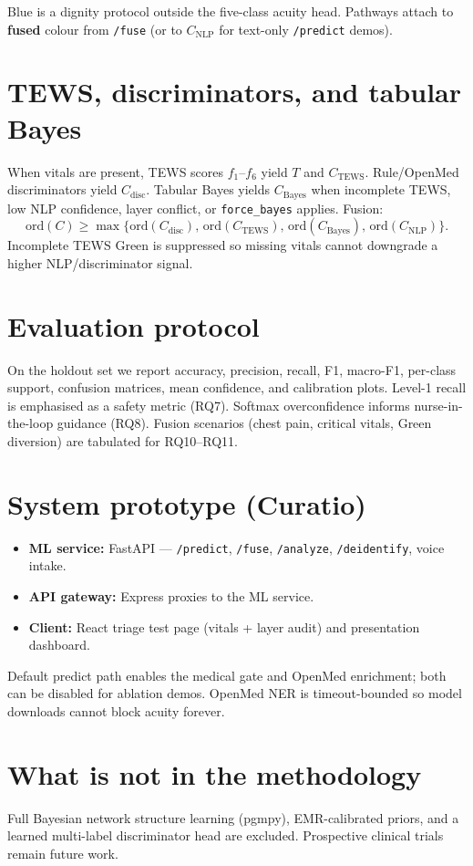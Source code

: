 Blue is a dignity protocol outside the five-class acuity head. Pathways attach to \textbf{fused} colour from \texttt{/fuse} (or to \(C_{\mathrm{NLP}}\) for text-only \texttt{/predict} demos).

\section{TEWS, discriminators, and tabular Bayes}

When vitals are present, TEWS scores \(f_1\)--\(f_6\) yield \(T\) and \(C_{\mathrm{TEWS}}\). Rule/OpenMed discriminators yield \(C_{\mathrm{disc}}\). Tabular Bayes yields \(C_{\mathrm{Bayes}}\) when incomplete TEWS, low NLP confidence, layer conflict, or \texttt{force\_bayes} applies. Fusion:
\[
\mathrm{ord}(C)\ge\max\bigl\{\mathrm{ord}(C_{\mathrm{disc}}),\,\mathrm{ord}(C_{\mathrm{TEWS}}),\,\mathrm{ord}(C_{\mathrm{Bayes}}),\,\mathrm{ord}(C_{\mathrm{NLP}})\bigr\}.
\]
Incomplete TEWS Green is suppressed so missing vitals cannot downgrade a higher NLP/discriminator signal.

\section{Evaluation protocol}

On the holdout set we report accuracy, precision, recall, F1, macro-F1, per-class support, confusion matrices, mean confidence, and calibration plots. Level-1 recall is emphasised as a safety metric (RQ7). Softmax overconfidence informs nurse-in-the-loop guidance (RQ8). Fusion scenarios (chest pain, critical vitals, Green diversion) are tabulated for RQ10--RQ11.

\section{System prototype (Curatio)}

\begin{itemize}
  \item \textbf{ML service:} FastAPI --- \texttt{/predict}, \texttt{/fuse}, \texttt{/analyze}, \texttt{/deidentify}, voice intake.
  \item \textbf{API gateway:} Express proxies to the ML service.
  \item \textbf{Client:} React triage test page (vitals + layer audit) and presentation dashboard.
\end{itemize}

Default predict path enables the medical gate and OpenMed enrichment; both can be disabled for ablation demos. OpenMed NER is timeout-bounded so model downloads cannot block acuity forever.

\section{What is not in the methodology}

Full Bayesian network structure learning (pgmpy), EMR-calibrated priors, and a learned multi-label discriminator head are excluded. Prospective clinical trials remain future work.
